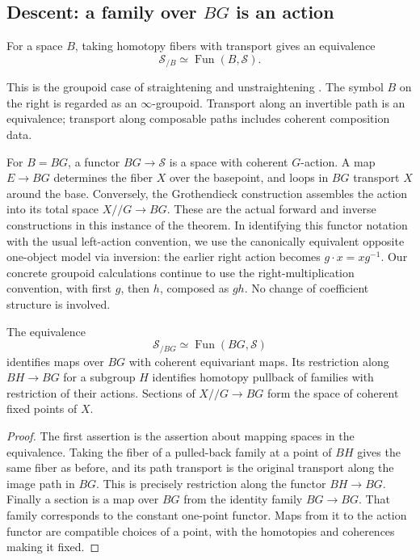 \subsection{Descent: a family over \texorpdfstring{$BG$}{BG} is an action}

\begin{theorem}
\label{h:straightening}
For a space $B$, taking homotopy fibers with transport gives an equivalence
\[
 \mathcal S_{/B}\simeq\operatorname{Fun}(B,\mathcal S).
\]
\end{theorem}
This is the groupoid case of straightening and unstraightening
\cite[\S\S2.2,3.2]{HTT}.  The symbol $B$ on the right is regarded as
an $\infty$-groupoid.  Transport along an invertible path is an equivalence;
transport along composable paths includes coherent composition data.

For $B=BG$, a functor $BG\to\mathcal S$ is a space with coherent
$G$-action.  A map $E\to BG$ determines the fiber $X$ over the basepoint,
and loops in $BG$ transport $X$ around the base.  Conversely, the
Grothendieck construction assembles the action into its total space
$X/\!/G\to BG$.  These are the actual forward and inverse constructions
in this instance of the theorem.  In identifying this functor notation
with the usual left-action convention, we use the canonically equivalent
opposite one-object model via inversion: the earlier right action becomes
$g\cdot x=xg^{-1}$.  Our concrete groupoid calculations continue to use
the right-multiplication convention, with first $g$, then $h$, composed
as $gh$.  No change of coefficient structure is involved.

\begin{corollary}
\label{h:action-descent}
The equivalence
\[
 \mathcal S_{/BG}\simeq\operatorname{Fun}(BG,\mathcal S)
\]
identifies maps over $BG$ with coherent equivariant maps.  Its restriction
along $BH\to BG$ for a subgroup $H$ identifies homotopy pullback of families
with restriction of their actions.  Sections of $X/\!/G\to BG$ form the
space of coherent fixed points of $X$.
\end{corollary}
\begin{proof}
The first assertion is the assertion about mapping spaces in the
equivalence.  Taking the fiber of a pulled-back family at a point of $BH$
gives the same fiber as before, and its path transport is the original
transport along the image path in $BG$.  This is precisely restriction
along the functor $BH\to BG$.  Finally a section is a map over $BG$ from
the identity family $BG\to BG$.  That family corresponds to the constant
one-point functor.  Maps from it to the action functor are compatible
choices of a point, with the homotopies and coherences making it fixed.
\end{proof}

